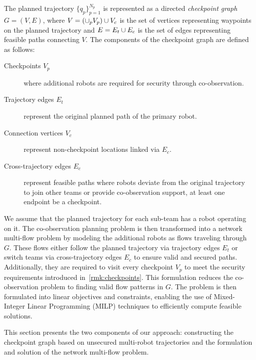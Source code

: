 \documentclass[10pt,twocolumn,twoside]{IEEEtran}
\begin{document}
\begin{definition}
  The planned trajectory $\{q_p\}_{p=1}^{N_p}$ is represented as a directed \emph{checkpoint graph} $G=(V, E)$, where $V = (\cup_p V_p) \cup V_c$ is the set of vertices representing waypoints on the planned trajectory and $E = E_{t} \cup E_{c}$ is the set of edges representing feasible paths connecting $V$. The components of the checkpoint graph are defined as follows:
  \begin{description}
    \item[Checkpoints $V_p$] where additional robots are required for security through co-observation.
    \item[Trajectory edges $E_t$] represent the original planned path of the primary robot.
    \item[Connection vertices $V_c$] represent non-checkpoint locations linked via $E_c$.
    \item[Cross-trajectory edges $E_c$] represent feasible paths where robots deviate from the original trajectory to join other teams or provide co-observation support, at least one endpoint be a checkpoint. 
  \end{description}
\end{definition}

We assume that the planned trajectory for each sub-team has a robot operating on it. The co-observation planning problem is then transformed into a network multi-flow problem by modeling the additional robots as flows traveling through $G$. These flows either follow the planned trajectory via trajectory edges $E_t$ or switch teams via cross-trajectory edges $E_c$ to ensure valid and secured paths. Additionally, they are required to visit every checkpoint $V_p$ to meet the security requirements introduced in~\ref{rmk:checkpoints}. This formulation reduces the co-observation problem to finding valid flow patterns in $G$. The problem is then formulated into linear objectives and constraints, enabling the use of Mixed-Integer Linear Programming (MILP) techniques to efficiently compute feasible solutions. 

This section presents the two components of our approach: constructing the checkpoint graph based on unsecured multi-robot trajectories and the formulation and solution of the network multi-flow problem.
\end{document}
